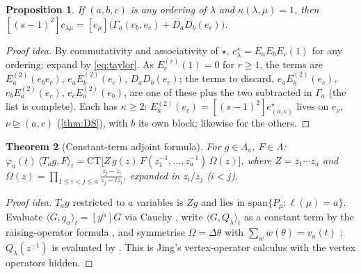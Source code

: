 \documentclass[submission]{FPSAC2027}
\newtheorem{theorem}{Theorem}[section]
\newtheorem{proposition}[theorem]{Proposition}
\theoremstyle{definition}
\theoremstyle{remark}
\newcommand{\Lam}{\Lambda}
\begin{document}
\begin{proposition}\label{prop:reduce}
If $(a,b,c)$ is any ordering of $\lambda$ and $\kappa(\lambda,\mu)=1$, then $[(s-1)^2]c_{\lambda\mu}=[e_\mu]\bigl(\Gamma_a(e_b,e_c)+D_aD_b(e_c)\bigr)$.
\end{proposition}
\begin{proof}[Proof idea]
By commutativity and associativity of $\star$, $e^\star_\lambda=E_aE_bE_c(1)$ for any ordering; expand by \eqref{eq:taylor}. As $E_c^{(r)}(1)=0$ for $r\ge1$, the terms are $E_a^{(2)}(e_be_c)$, $e_aE_b^{(2)}(e_c)$, $D_aD_b(e_c)$; the terms to discard, $e_aE_b^{(2)}(e_c)$, $e_bE_a^{(2)}(e_c)$, $e_cE_a^{(2)}(e_b)$, are one of these plus the two subtracted in $\Gamma_a$ (the list is complete). Each has $\kappa\ge2$: $E_a^{(2)}(e_c)=[(s-1)^2]e^\star_{(a,c)}$ lives on $e_\nu$, $\nu\trianglerighteq(a,c)$ (\cref{thm:DS}), with $b$ its own block; likewise for the others.
\end{proof}

\begin{theorem}[Constant-term adjoint formula]\label{thm:CT}
For $g\in\Lam_a$, $F\in\Lam$: $\varphi_a(t)\,\langle T_ag,F\rangle_t=\mathrm{CT}\bigl[Z\,g(z)\,F(z_1^{-1},\dots,z_a^{-1})\,\Omega(z)\bigr]$, where $Z=z_1\cdots z_a$ and $\Omega(z)=\prod_{1\le i<j\le a}\frac{z_j-z_i}{z_j-tz_i}$, expanded in $z_i/z_j$ ($i<j$).
\end{theorem}
\begin{proof}[Proof idea]
$T_ag$ restricted to $a$ variables is $Zg$ and lies in $\mathrm{span}\{P_\mu:\ell(\mu)=a\}$. Evaluate $\langle G,q_\alpha\rangle_t=[y^\alpha]G$ via Cauchy \cite[III (4.2), (4.4), (4.8)--(4.9)]{Macdonald95}, write $\langle G,Q_\lambda\rangle_t$ as a constant term by the raising-operator formula \cite[III (2.15$'$)]{Macdonald95}, and symmetrise $\Omega=\Delta\theta$ with $\sum_w w(\theta)=v_a(t)$ \cite[III (1.4)]{Macdonald95}; $Q_\lambda(z^{-1})$ is evaluated by \cite[III (2.1), (2.11)--(2.12)]{Macdonald95}. This is Jing's vertex-operator calculus \cite{Jing91} with the vertex operators hidden.
\end{proof}
\end{document}
